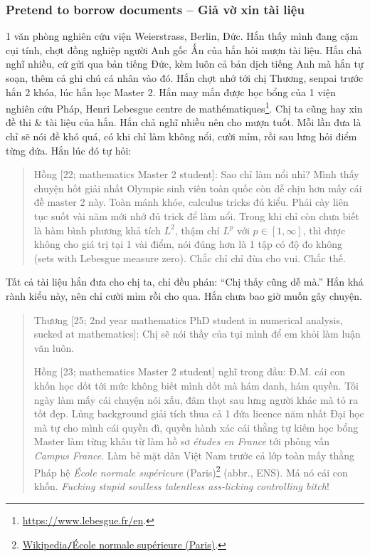 \documentclass[12pt]{article}
\begin{document}
\subsubsection{Pretend to borrow documents -- Giả vờ xin tài liệu}
1 văn phòng nghiên cứu viện Weierstrass, Berlin, Đức. Hắn thấy mình đang cặm cụi tính, chợt đồng nghiệp người Anh gốc Ấn của hắn hỏi mượn tài liệu. Hắn chả nghĩ nhiều, cứ gửi qua bản tiếng Đức, kèm luôn cả bản dịch tiếng Anh mà hắn tự soạn, thêm cả ghi chú cá nhân vào đó. Hắn chợt nhớ tới chị Thương, senpai trước hắn 2 khóa, lúc hắn học Master 2. Hắn may mắn được học bổng của 1 viện nghiên cứu Pháp, Henri Lebesgue centre de math\'ematiques\footnote{\url{https://www.lebesgue.fr/en}.}. Chị ta cũng hay xin đề thi \& tài liệu của hắn. Hắn chả nghĩ nhiều nên cho mượn tuốt. Mỗi lần đưa là chỉ sẽ nói đề khó quá, có khi chỉ làm không nổi, cười mỉm, rồi sau lưng hỏi điểm từng đứa. Hắn lúc đó tự hỏi:
\begin{quote}
	{\sf Hồng [22; mathematics Master 2 student]}: Sao chỉ làm nổi nhỉ? Mình thấy chuyện hốt giải nhất Olympic sinh viên toàn quốc còn dễ chịu hơn mấy cái đề master 2 này. Toàn mánh khóe, calculus tricks đủ kiểu. Phải cày liên tục suốt vài năm mới nhớ đủ trick để làm nổi. Trong khi chỉ còn chưa biết là hàm bình phương khả tích $L^2$, thậm chí $L^p$ với $p\in[1,\infty]$, thì được không cho giá trị tại 1 vài điểm, nói đúng hơn là 1 tập có độ đo không (sets with Lebesgue measure zero). Chắc chỉ chỉ đùa cho vui. Chắc thế.
\end{quote}
Tất cả tài liệu hắn đưa cho chị ta, chỉ đều phán: ``Chị thấy cũng dễ mà.'' Hắn khá rành kiểu này, nên chỉ cười mỉm rồi cho qua. Hắn chưa bao giờ muốn gây chuyện.
\begin{quote}
	{\sf Thương [25; 2nd year mathematics PhD student in numerical analysis, sucked at mathematics]}: Chị sẽ nói thầy của tụi mình để em khỏi làm luận văn luôn.
	
	{\sf Hồng [23; mathematics Master 2 student]} nghĩ trong đầu: Đ.M. cái con khốn học dốt tới mức không biết mình dốt mà hám danh, hám quyền. Tối ngày làm mấy cái chuyện nói xấu, đâm thọt sau lưng người khác mà tỏ ra tốt đẹp. Lủng background giải tích thua cả 1 đứa licence năm nhất Đại học mà tự cho mình cái quyền đì, quyền hành xác cái thằng tự kiếm học bổng Master làm từng khâu từ làm hồ sơ {\it \'etudes en France} tới phỏng vấn {\it Campus France}. Làm bẻ mặt dân Việt Nam trước cả lớp toàn mấy thằng Pháp hệ {\it École normale supérieure} (Paris)\footnote{\href{https://en.wikipedia.org/wiki/Ecole_normale_superieure_(Paris)}{Wikipedia{\tt/}École normale supérieure (Paris)}.} (abbr., ENS). Má nó cái con khốn. {\it Fucking stupid soulless talentless ass-licking controlling bitch}!
\end{quote}
\end{document}
